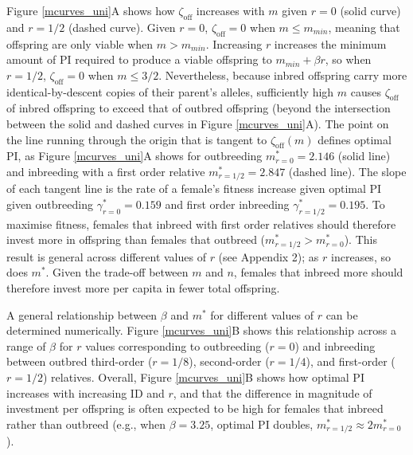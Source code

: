 \documentclass[12pt]{article}
\begin{document}
Figure \ref{mcurves_uni}A shows how $\zeta_{\textrm{off}}$ increases with $m$ given $r=0$ (solid curve) and $r=1/2$ (dashed curve). Given $r=0$, $\zeta_{\textrm{off}}=0$ when $m \leq m_{min}$, meaning that offspring are only viable when $m>m_{min}$. Increasing $r$ increases the minimum amount of PI required to produce a viable offspring to $m_{min}+\beta r$, so when $r=1/2$, $\zeta_{\textrm{off}}=0$ when $m \leq 3/2$. Nevertheless, because inbred offspring carry more identical-by-descent copies of their parent's alleles, sufficiently high $m$ causes $\zeta_{\textrm{off}}$ of inbred offspring to exceed that of outbred offspring (beyond the intersection between the solid and dashed curves in Figure \ref{mcurves_uni}A). The point on the line running through the origin that is tangent to $\zeta_{\textrm{off}}(m)$ defines optimal PI, as Figure \ref{mcurves_uni}A shows for outbreeding $m^{*}_{r=0}=2.146$ (solid line) and inbreeding with a first order relative $m^{*}_{r=1/2}=2.847$ (dashed line). The slope of each tangent line is the rate of a female's fitness increase given optimal PI given outbreeding $\gamma^{*}_{r=0}=0.159$ and first order inbreeding $\gamma^{*}_{r=1/2}=0.195$. To maximise fitness, females that inbreed with first order relatives should therefore invest more in offspring than females that outbreed ($m^{*}_{r=1/2}>m^{*}_{r=0}$). This result is general across different values of $r$ (see Appendix 2); as $r$ increases, so does $m^{*}$. Given the trade-off between $m$ and $n$, females that inbreed more should therefore invest more per capita in fewer total offspring. 

A general relationship between $\beta$ and $m^{*}$ for different values of $r$ can be determined numerically. Figure \ref{mcurves_uni}B shows this relationship across a range of $\beta$ for $r$ values corresponding to outbreeding ($r=0$) and inbreeding between outbred third-order ($r=1/8$), second-order ($r=1/4$), and first-order ($r=1/2$) relatives. Overall, Figure \ref{mcurves_uni}B shows how optimal PI increases with increasing ID and $r$, and that the difference in magnitude of investment per offspring is often expected to be high for females that inbreed rather than outbreed (e.g., when $\beta=3.25$, optimal PI doubles, $m^{*}_{r=1/2} \approx 2m^{*}_{r=0}$). %
\end{document}

